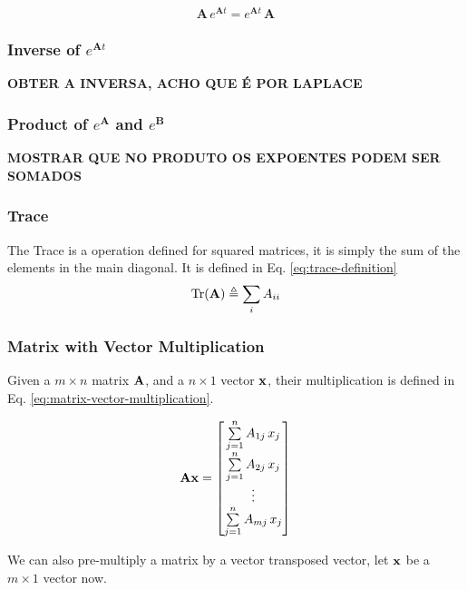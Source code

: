 \documentclass[12pt]{article}
\begin{document}
\begin{equation}
\mathbf{A} \, e^{\mathbf{A} t} = e^{\mathbf{A} t} \, \mathbf{A} 
\label{eq:commutativity-exp-of-a-and-a}
\end{equation}

\subsubsection{Inverse of $e^{\mathbf{A}t}$}
\color{blue}
\textbf{OBTER A INVERSA, ACHO QUE É POR LAPLACE}
\color{black}

\subsubsection{Product of $e^{\mathbf{A}}$ and $e^{\mathbf{B}}$}
\color{blue}
\textbf{MOSTRAR QUE NO PRODUTO OS EXPOENTES PODEM SER SOMADOS}
\color{black}

\subsubsection{Trace}
The Trace is a operation defined for squared matrices, it is simply the sum of the elements in the main diagonal. It is defined in Eq. \ref{eq:trace-definition}
\begin{equation}
    \operatorname{Tr}(\boldsymbol{\mathbf{A}}) \triangleq \sum\limits_{i} A_{ii}
    \label{eq:trace-definition}
\end{equation}

\subsubsection{Matrix with Vector Multiplication}
Given a $m\times n$ matrix $\boldsymbol{\mathbf{A}}$, and a $n\times 1$ vector $\boldsymbol{\mathbf{x}}$, their multiplication is defined in Eq. \ref{eq:matrix-vector-multiplication}.

\begin{equation}
    \boldsymbol{\mathbf{A}} \boldsymbol{\mathbf{x}} = \begin{bmatrix}
        \sum\limits_{j=1}^{n} A_{1j} \,x_j \\
        \sum\limits_{j=1}^{n} A_{2j} \,x_j \\
        \vdots \\
        \sum\limits_{j=1}^{n} A_{mj} \,x_j \\
    \end{bmatrix}
    \label{eq:matrix-vector-multiplication}
\end{equation}

We can also pre-multiply a matrix by a vector transposed vector, let $\boldsymbol{\mathbf{x}}$ be a $m\times 1$ vector now.
\end{document}
